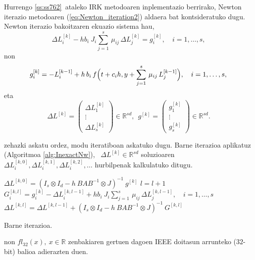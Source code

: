 Hurrengo  \ref{ss:ss762}~ataleko IRK metodoaren inplementazio berrirako, Newton iterazio metodoaren (\ref{eq:Newton_iteration2}) aldaera bat kontsideratuko dugu. Newton iterazio bakoitzaren ekuazio sistema hau, 
\begin{equation}
\label{eq:linsysZ}
 \Delta L_{i}^{[k]}  - h b_i \ J_i \sum_{j=1}^{s}\, \mu_{ij} \, \Delta L_{j}^{[k]} = g_i^{[k]}, \quad  i=1 ,\ldots, s, 
\end{equation}
non
\begin{equation}
\label{eq:gk}
g_i^{[k]} = -L_{i}^{[k-1]}  + h \, b_i\, f\Big(t+c_i h,  y+\sum_{j=1}^{s}\, \mu_{ij}\, L_{j}^{[k-1]}\Big), \quad  i=1 ,\ldots, s, \\
\end{equation}
eta
\begin{equation*}
\Delta L^{[k]}= \left(
\begin{matrix}
\Delta L_1^{[k]}\\
\vdots\\
\Delta L_s^{[k]}
\end{matrix}
\right) \in \mathbb{R}^{sd}, \ \
g^{[k]}= \left(
\begin{matrix}
g_1^{[k]} \\
\vdots\\
g_s^{[k]}
\end{matrix}
\right) \in \mathbb{R}^{sd}.
\end{equation*}

zehazki askatu ordez, modu iteratiboan askatuko dugu. Barne iterazioa  aplikatuz (Algoritmoa \ref{alg:InexactNw}), ~$\Delta L^{[k]} \in \mathbb{R}^{sd}$ soluzioaren  $ \Delta L_{i}^{[k,0]},  \Delta L_{i}^{[k,1]},  \Delta L_{i}^{[k,2]}, \ldots$ hurbilpenak kalkulatuko ditugu. 

\begin{algorithm}[H]
  $ \Delta L^{[k,0]} = (I_s \otimes I_d - h \ BAB^{-1} \otimes J)^{-1} \ g^{[k]}$\;
  \BlankLine
  {
   \BlankLine
   $l=l+1$\;
   $G_i^{[k,l]} = g_i^{[k]} - \Delta L_{i}^{[k,l-1]}  + h b_i \ J_i \sum_{j=1}^{s}\, \mu_{ij} \, \Delta L_{j}^{[k,l-1]},  \quad  i=1 ,\ldots, s$\;
   \BlankLine
   $\Delta L^{[k,l]}=\Delta L^{[k,l-1]}+ (I_s \otimes I_d - h \ BAB^{-1} \otimes J)^{-1} \ G^{[k,l]}$\;
  }
 \caption{Barne iterazioa.}
 \label{alg:InexactNw}
\end{algorithm}

non $fl_{32}(x), \ x \in \mathbb{R}$ zenbakiaren gertuen dagoen IEEE doitasun arrunteko ($32$-bit) balioa adierazten duen.

